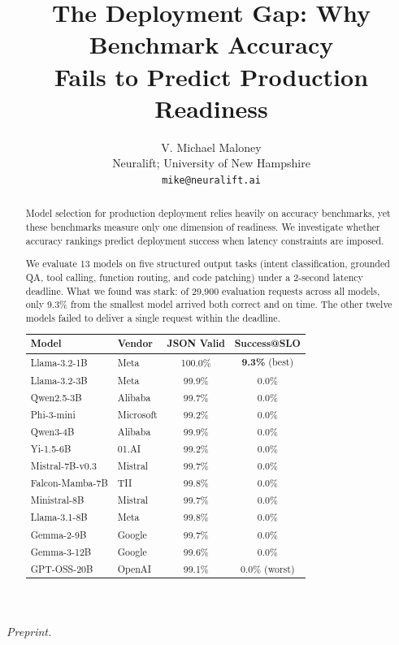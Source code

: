 \documentclass[11pt]{article}
\title{The Deployment Gap: Why Benchmark Accuracy\\Fails to Predict Production Readiness}
\author{
V. Michael Maloney \\
Neuralift; University of New Hampshire \\
\texttt{mike@neuralift.ai}
}
\date{}
\begin{document}
\maketitle
\begin{center}
\textit{Preprint.}
\end{center}

\begin{abstract}
Model selection for production deployment relies heavily on accuracy benchmarks, yet these benchmarks measure only one dimension of readiness.  We investigate whether accuracy rankings predict deployment success when latency constraints are imposed.

We evaluate 13 models on five structured output tasks (intent classification, grounded QA, tool calling, function routing, and code patching) under a 2-second latency deadline.  What we found was stark: of 29,900 evaluation requests across all models, only 9.3\% from the smallest model arrived both correct and on time.  The other twelve models failed to deliver a single request within the deadline.

\begin{center}
\begin{tabular}{llcc}
\toprule
\textbf{Model} & \textbf{Vendor} & \textbf{JSON Valid} & \textbf{Success@SLO} \\
\midrule
Llama-3.2-1B & Meta & 100.0\% & \textbf{9.3\%} (best) \\
Llama-3.2-3B & Meta & 99.9\% & 0.0\% \\
Qwen2.5-3B & Alibaba & 99.7\% & 0.0\% \\
Phi-3-mini & Microsoft & 99.2\% & 0.0\% \\
Qwen3-4B & Alibaba & 99.9\% & 0.0\% \\
Yi-1.5-6B & 01.AI & 99.2\% & 0.0\% \\
Mistral-7B-v0.3 & Mistral & 99.7\% & 0.0\% \\
Falcon-Mamba-7B & TII & 99.8\% & 0.0\% \\
Ministral-8B & Mistral & 99.7\% & 0.0\% \\
Llama-3.1-8B & Meta & 99.8\% & 0.0\% \\
Gemma-2-9B & Google & 99.7\% & 0.0\% \\
Gemma-3-12B & Google & 99.6\% & 0.0\% \\
GPT-OSS-20B & OpenAI & 99.1\% & 0.0\% (worst) \\
\bottomrule
\end{tabular}
\end{center}


\end{abstract}
\end{document}
